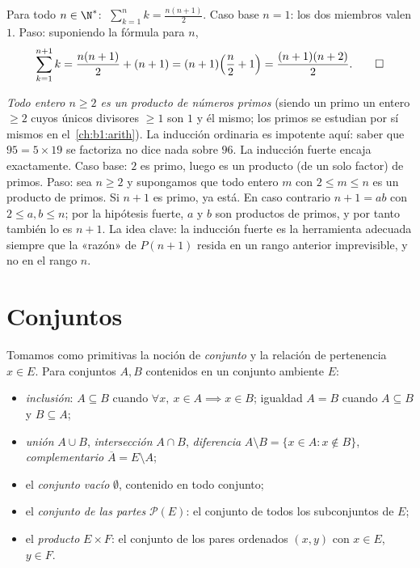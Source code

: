 \begin{example}\label{ex:b1:logic:induction}
Para todo $n \in \N^*$: $\;\sum_{k=1}^n k = \frac{n(n+1)}{2}$. Caso base
$n = 1$: los dos miembros valen $1$. Paso: suponiendo la fórmula para $n$,
\[
\sum_{k=1}^{n+1} k = \frac{n(n+1)}{2} + (n+1)
= (n+1)\Bigl(\frac n2 + 1\Bigr) = \frac{(n+1)(n+2)}{2}. \qedhere
\]
\end{example}

\begin{example}\label{ex:b1:logic:strongind}
\emph{Todo entero $n \geq 2$ es un producto de números primos} (siendo
un primo un entero $\geq 2$ cuyos únicos divisores $\geq 1$ son $1$ y él
mismo; los primos se estudian por sí mismos en el~\cref{ch:b1:arith}).
La inducción ordinaria es impotente aquí: saber que $95 = 5 \times 19$
se factoriza no dice nada sobre $96$. La inducción fuerte encaja
exactamente. Caso base: $2$ es primo, luego es un producto (de un solo
factor) de primos. Paso: sea $n \geq 2$ y supongamos que todo entero $m$
con $2 \leq m \leq n$ es un producto de primos. Si $n + 1$ es primo, ya
está. En caso contrario $n + 1 = ab$ con $2 \leq a, b \leq n$; por la
hipótesis fuerte, $a$ y $b$ son productos de primos, y por tanto también
lo es $n + 1$. La idea clave: la inducción fuerte es la herramienta
adecuada siempre que la «razón» de $P(n+1)$ resida en un rango anterior
imprevisible, y no en el rango $n$.
\end{example}

\section{Conjuntos}

\begin{definition}\label{def:b1:logic:sets}
Tomamos como primitivas la noción de \emph{conjunto} y
la relación de pertenencia $x \in E$. Para conjuntos $A, B$ contenidos
en un conjunto ambiente $E$:
\begin{itemize}
  \item \emph{inclusión}: $A \subseteq B$ cuando $\forall x,\ x \in A
        \implies x \in B$; igualdad $A = B$ cuando $A \subseteq B$ y
        $B \subseteq A$;
  \item \emph{unión} $A \cup B$, \emph{intersección} $A \cap B$,
        \emph{diferencia} $A \setminus B = \{x \in A : x \notin B\}$,
        \emph{complementario} $\overline{A} = E \setminus A$;
  \item el \emph{conjunto vacío} $\emptyset$, contenido en todo conjunto;
  \item el \emph{conjunto de las partes}
        $\mathcal{P}(E)$: el conjunto de todos los subconjuntos de $E$;
  \item el \emph{producto} $E \times F$: el conjunto de los pares
        ordenados $(x, y)$ con $x \in E$, $y \in F$.
\end{itemize}
\end{definition}

